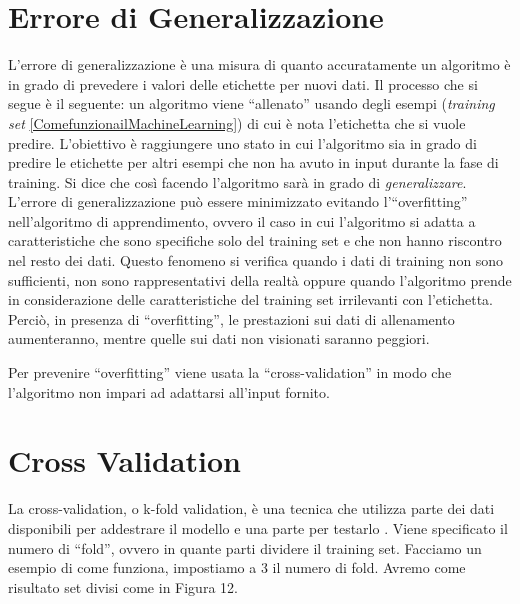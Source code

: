 \documentclass[12pt,italian]{report}
\begin{document}
\section{Errore di Generalizzazione}
\label{sec:errore}
L'errore di generalizzazione è una misura di quanto accuratamente un algoritmo è in grado di prevedere i valori delle etichette per nuovi dati.
Il processo che si segue è il seguente: un algoritmo viene ``allenato'' usando degli esempi (\emph{training set}  \ref{ComefunzionailMachineLearning}) di cui è nota l'etichetta che si vuole predire. L'obiettivo è raggiungere uno stato in cui l'algoritmo sia in grado di predire le etichette per altri esempi che non ha avuto in input durante la fase di training. Si dice che così facendo l'algoritmo sarà in grado di \emph{generalizzare}.
L'errore di generalizzazione può essere  minimizzato evitando l'``overfitting'' nell'algoritmo di apprendimento, ovvero il caso in cui l'algoritmo si adatta a caratteristiche che sono specifiche solo del training set e che non hanno riscontro nel resto dei dati. Questo fenomeno si verifica quando i dati di training non sono sufficienti, non sono rappresentativi della realtà oppure quando l'algoritmo prende in considerazione delle caratteristiche del training set irrilevanti con l'etichetta.  Perciò, in presenza di ``overfitting'', le prestazioni sui dati di allenamento aumenteranno, mentre quelle sui dati non visionati saranno peggiori. 

Per prevenire ``overfitting'' viene usata la ``cross-validation'' in modo che l'algoritmo non impari ad adattarsi all'input fornito.
\section{Cross Validation}
\label{cv}
La cross-validation, o k-fold validation, è una tecnica che utilizza parte dei dati disponibili per addestrare il modello e una parte per testarlo \cite{TheElementsofStatisticalLearning}. Viene specificato il numero di ``fold'', ovvero in quante parti dividere il training set. Facciamo un esempio di come funziona, impostiamo a 3 il numero di fold.	Avremo come risultato set divisi come in Figura 12.
\end{document}
